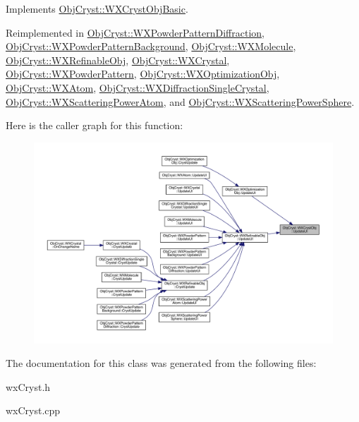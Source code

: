 Implements \mbox{\hyperlink{class_obj_cryst_1_1_w_x_cryst_obj_basic_a3818940b7031ff7e45cf2178c4a99c90}{Obj\+Cryst\+::\+W\+X\+Cryst\+Obj\+Basic}}.



Reimplemented in \mbox{\hyperlink{class_obj_cryst_1_1_w_x_powder_pattern_diffraction_acc1ee5836a4db2466007fe9ebb540e01}{Obj\+Cryst\+::\+W\+X\+Powder\+Pattern\+Diffraction}}, \mbox{\hyperlink{class_obj_cryst_1_1_w_x_powder_pattern_background_a7e54d0ef518f44f897d7363e7f96e4ae}{Obj\+Cryst\+::\+W\+X\+Powder\+Pattern\+Background}}, \mbox{\hyperlink{class_obj_cryst_1_1_w_x_molecule_ac234eca0ea8eb99e4d94387c506f1643}{Obj\+Cryst\+::\+W\+X\+Molecule}}, \mbox{\hyperlink{class_obj_cryst_1_1_w_x_refinable_obj_acbf70975a79661a73a1ae3c39c9c3045}{Obj\+Cryst\+::\+W\+X\+Refinable\+Obj}}, \mbox{\hyperlink{class_obj_cryst_1_1_w_x_crystal_a62946717943682dc2ac07ea4584030f4}{Obj\+Cryst\+::\+W\+X\+Crystal}}, \mbox{\hyperlink{class_obj_cryst_1_1_w_x_powder_pattern_aaeace05033eaea9499398825fc8244da}{Obj\+Cryst\+::\+W\+X\+Powder\+Pattern}}, \mbox{\hyperlink{class_obj_cryst_1_1_w_x_optimization_obj_a4643e15059bdd46e65c0ac18d7491787}{Obj\+Cryst\+::\+W\+X\+Optimization\+Obj}}, \mbox{\hyperlink{class_obj_cryst_1_1_w_x_atom_a09c1212622fe6bb17ca8443455370551}{Obj\+Cryst\+::\+W\+X\+Atom}}, \mbox{\hyperlink{class_obj_cryst_1_1_w_x_diffraction_single_crystal_a2b8ef5fa0663d1526258a17498e9b0fc}{Obj\+Cryst\+::\+W\+X\+Diffraction\+Single\+Crystal}}, \mbox{\hyperlink{class_obj_cryst_1_1_w_x_scattering_power_atom_abd8a32f23a0b29e45ae32e40f0fec212}{Obj\+Cryst\+::\+W\+X\+Scattering\+Power\+Atom}}, and \mbox{\hyperlink{class_obj_cryst_1_1_w_x_scattering_power_sphere_a2e1eed3ea3e179e57621251cc844be3e}{Obj\+Cryst\+::\+W\+X\+Scattering\+Power\+Sphere}}.

Here is the caller graph for this function\+:
\nopagebreak
\begin{figure}[H]
\begin{center}
\leavevmode
\includegraphics[width=350pt]{class_obj_cryst_1_1_w_x_cryst_obj_a6578681b14426e8a844ac6e4ca7fafea_icgraph}
\end{center}
\end{figure}


The documentation for this class was generated from the following files\+:\begin{DoxyCompactItemize}
\item 
wx\+Cryst.\+h\item 
wx\+Cryst.\+cpp\end{DoxyCompactItemize}

